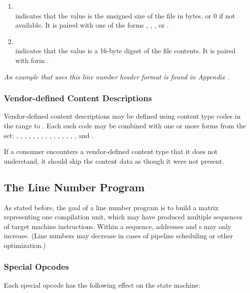 \begin{enumerate}[1. ]
\item  \DWLNCTsizeTARG \\
\DWLNCTsizeNAME{} indicates that the value is the unsigned size of the
file in bytes, or 0 if not available. It is paired with one of the
forms \DWFORMudata, \DWFORMdataone, \DWFORMdatatwo, \DWFORMdatafour{}
or \DWFORMdataeight.
 
\item \DWLNCTMDfiveTARG \\
\DWLNCTMDfiveNAME{} indicates that the value is a 16-byte \MDfive{} digest
of the file contents. It is paired with form \DWFORMdatasixteen.
\end{enumerate}

\textit{An example that uses this line number header format
is found in Appendix .}

\subsubsection{Vendor-defined Content Descriptions}
Vendor-defined content descriptions may be defined using content
type codes in the range \DWLNCTlouserTARG{} to \DWLNCThiuserTARG{}. Each
such code may be combined with one or more forms from the set:
\DWFORMblock, \DWFORMblockone, \DWFORMblocktwo, \DWFORMblockfour,
\DWFORMdataone, \DWFORMdatatwo, \DWFORMdatafour, \DWFORMdataeight,
\DWFORMdatasixteen,
\DWFORMflag, \DWFORMlinestrp, \DWFORMsdata, \DWFORMsecoffset,
\DWFORMstring, \DWFORMstrp, \DWFORMstrx{}  and \DWFORMudata.

If a consumer encounters a vendor-defined content type that
it does not understand, it should skip the content data as though
it were not present.

\subsection{The Line Number Program}
\label{linenumberprogram}
As stated before, the goal of a line number program is to build
a matrix representing one compilation unit, which may have
produced multiple sequences of target machine instructions.
Within a sequence, addresses and 
s may only increase. 
(Line numbers may decrease in cases of pipeline
scheduling or other optimization.)

\subsubsection{Special Opcodes} 
\label{chap:specialopcodes}
Each \HFTubyte{} special opcode has the following effect on the state machine:

